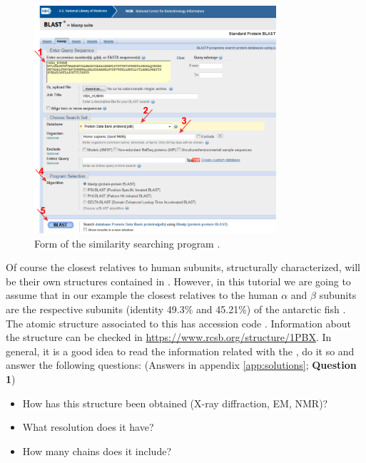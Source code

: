   \begin{figure}[H]
  \centering 
  \captionsetup{width=.7\linewidth} 
  \includegraphics[width=0.80\textwidth]{Images/Fig9}
  \caption{Form of the similarity searching program .}
  \label{fig:blastp}
  \end{figure}
  
  Of course the closest relatives to human  subunits, structurally characterized, will be their own structures contained in . However, in this tutorial we are going to assume that in our example the closest relatives to the human  $\alpha$ and $\beta$ subunits are the respective  subunits (identity 49.3\% and 45.21\%) of the antarctic fish  \citep{camardella1992}. The atomic structure associated to this  has  accession code . Information about the structure can be checked in \url{https://www.rcsb.org/structure/1PBX}. In general, it is a good idea to read the information related with the , do it so and answer the following questions: (Answers in appendix \ref{app:solutions}; \textbf{Question 1})
  
  \begin{minipage}{\linewidth}
  \begin{framed}
  \begin{itemize}
  \item How has this structure been obtained (X-ray diffraction, EM, NMR)?
  \item What resolution does it have?
  \item How many chains does it include?
  \end{itemize}
  \end{framed}
  \end{minipage}
